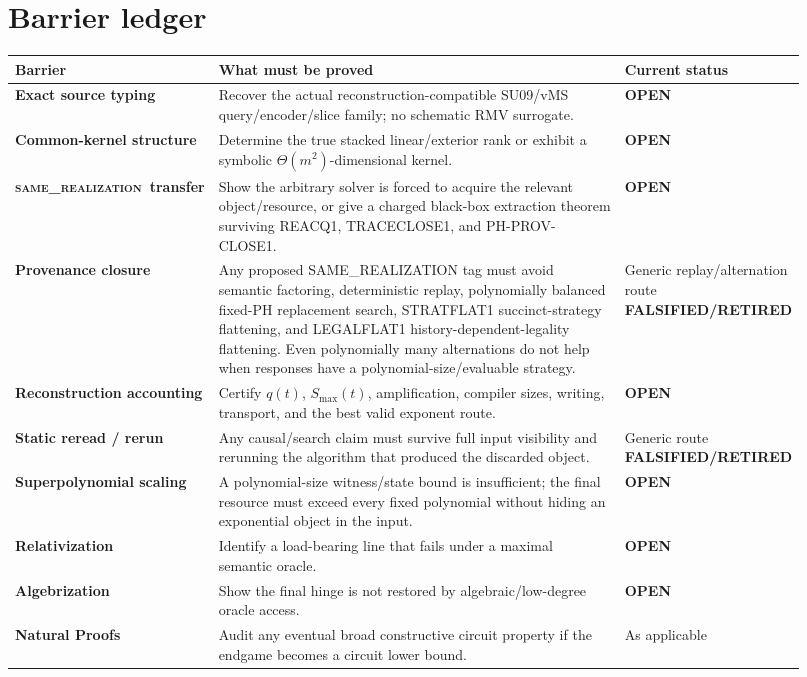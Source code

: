 \documentclass[11pt]{article}
\newcommand{\statusopen}{\textcolor{openstatus}{\textbf{OPEN}}}
\newcommand{\statusretired}{\textcolor{retired}{\textbf{FALSIFIED/RETIRED}}}
\newcommand{\same}{\textnormal{\textsc{same\_realization}}}
\begin{document}
\section{Barrier ledger}

\begin{longtable}{>{\bfseries}p{0.21\linewidth} p{0.52\linewidth} p{0.19\linewidth}}
\toprule
Barrier & What must be proved & Current status \\
\midrule
Exact source typing &
Recover the actual reconstruction-compatible SU09/vMS query/encoder/slice family; no schematic RMV
surrogate. & \statusopen \\

Common-kernel structure &
Determine the true stacked linear/exterior rank or exhibit a symbolic
\(\Theta(m^2)\)-dimensional kernel. & \statusopen \\

\same\ transfer &
Show the arbitrary solver is forced to acquire the relevant object/resource, or give a charged
black-box extraction theorem surviving REACQ1, TRACECLOSE1, and PH-PROV-CLOSE1. & \statusopen \\

Provenance closure &
Any proposed SAME\_REALIZATION tag must avoid semantic factoring, deterministic replay,
polynomially balanced fixed-PH replacement search, STRATFLAT1 succinct-strategy flattening, and LEGALFLAT1 history-dependent-legality flattening.
Even polynomially many alternations do not help when responses have a polynomial-size/evaluable
strategy. & Generic replay/alternation route \statusretired \\

Reconstruction accounting &
Certify \(q(t)\), \(S_{\max}(t)\), amplification, compiler sizes, writing, transport, and the best
valid exponent route. & \statusopen \\

Static reread / rerun &
Any causal/search claim must survive full input visibility and rerunning the algorithm that produced
the discarded object. & Generic route \statusretired \\

Superpolynomial scaling &
A polynomial-size witness/state bound is insufficient; the final resource must exceed every fixed
polynomial without hiding an exponential object in the input. & \statusopen \\

Relativization &
Identify a load-bearing line that fails under a maximal semantic oracle. & \statusopen \\

Algebrization &
Show the final hinge is not restored by algebraic/low-degree oracle access. & \statusopen \\

Natural Proofs &
Audit any eventual broad constructive circuit property if the endgame becomes a circuit lower bound. &
As applicable \\
\bottomrule
\end{longtable}
\end{document}

